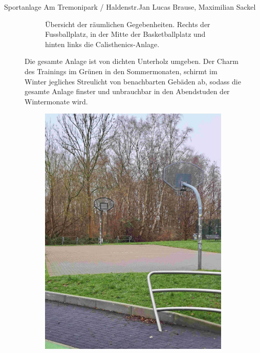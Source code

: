 \documentclass{../../templates/amendment}
\begin{document}
\begin{boxed}{Sportanlage Am Tremonipark / Haldenstr.}{Jan Lucas Brause, Maximilian Sackel}
\begin{figure}[htpb]
\begin{subfigure}{0.5\textwidth}
\begin{center}
                \caption{Übersicht der räumlichen Gegebenheiten. Rechts der
                    Fussballplatz, in der Mitte der Basketballplatz und hinten links
                die Calisthenics-Anlage.}%
            \end{center}
        \end{subfigure}
        \caption{Die gesamte Anlage ist von dichten Unterholz umgeben. Der Charm
            des Trainings im Grünen in den Sommermonaten,
            schirmt im Winter jegliches Streulicht von benachbarten Gebäden ab,
            sodass die gesamte Anlage finster und unbrauchbar in den Abendstuden der Wintermonate wird.
        }
    \end{figure}

    \begin{figure}[htpb]
        \centering
        \begin{subfigure}[]{0.32\textwidth}
            \begin{center}
                \includegraphics[width=\linewidth]{pictures/photo2.jpg}

\end{center}
\end{subfigure}
\end{figure}
\end{boxed}
\end{document}
